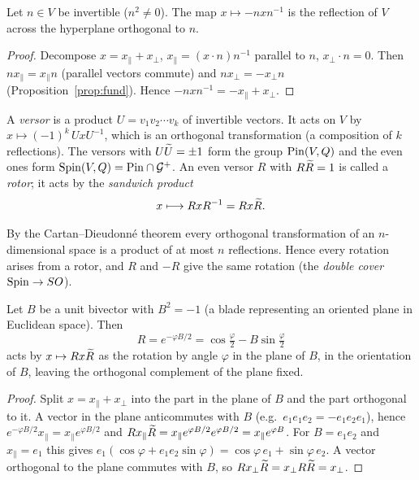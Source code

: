 
\begin{theorem}[Reflections]\label{thm:refl}
Let $n\in V$ be invertible ($n^2\neq0$). The map $x\mapsto -nxn^{-1}$ is the reflection of $V$ across the hyperplane orthogonal to $n$.
\end{theorem}
\begin{proof}
Decompose $x=x_\parallel+x_\perp$, $x_\parallel=(x\cdot n)n^{-1}$ parallel to $n$, $x_\perp\cdot n=0$. Then $nx_\parallel=x_\parallel n$ (parallel vectors commute) and $nx_\perp=-x_\perp n$ (Proposition~\ref{prop:fund}). Hence
$-nxn^{-1}=-x_\parallel+x_\perp$.
\end{proof}

\begin{definition}
A \emph{versor} is a product $U=v_1v_2\cdots v_k$ of invertible vectors. It acts on $V$ by
$x\mapsto(-1)^k\,UxU^{-1}$, which is an orthogonal transformation (a composition of $k$ reflections). The versors with $U\widetilde{U}=\pm1$ form the group $\mathrm{Pin}(V,Q)$ and the even ones form $\mathrm{Spin}(V,Q)=\mathrm{Pin}\cap\mathcal{G}^+$. An even versor $R$ with $R\widetilde{R}=1$ is called a \emph{rotor}; it acts by the \emph{sandwich product}
\[
 x\longmapsto RxR^{-1}=Rx\widetilde{R} .
\]
\end{definition}

By the Cartan--Dieudonn\'e theorem every orthogonal transformation of an $n$-dimensional space is a product of at most $n$ reflections. Hence every rotation arises from a rotor, and $R$ and $-R$ give the same rotation (the \emph{double cover} $\mathrm{Spin}\to SO$).

\begin{theorem}\label{thm:rotor}
Let $B$ be a unit bivector with $B^2=-1$ (a blade representing an oriented plane in Euclidean space). Then
\[
 R=e^{-\varphi B/2}=\cos\tfrac\varphi2-B\sin\tfrac\varphi2
\]
acts by $x\mapsto Rx\widetilde{R}$ as the rotation by angle $\varphi$ in the plane of $B$, in the orientation of $B$, leaving the orthogonal complement of the plane fixed.
\end{theorem}
\begin{proof}
Split $x=x_\parallel+x_\perp$ into the part in the plane of $B$ and the part orthogonal to it. A vector in the plane anticommutes with $B$ (e.g.\ $e_1e_1e_2=-e_1e_2e_1$), hence $e^{-\varphi B/2}x_\parallel=x_\parallel e^{\varphi B/2}$ and
$Rx_\parallel\widetilde{R}=x_\parallel e^{\varphi B/2}e^{\varphi B/2}=x_\parallel e^{\varphi B}$. For $B=e_1e_2$ and $x_\parallel=e_1$ this gives $e_1(\cos\varphi+e_1e_2\sin\varphi)=\cos\varphi\,e_1+\sin\varphi\,e_2$. A vector orthogonal to the plane commutes with $B$, so $Rx_\perp\widetilde{R}=x_\perp R\widetilde{R}=x_\perp$.
\end{proof}

